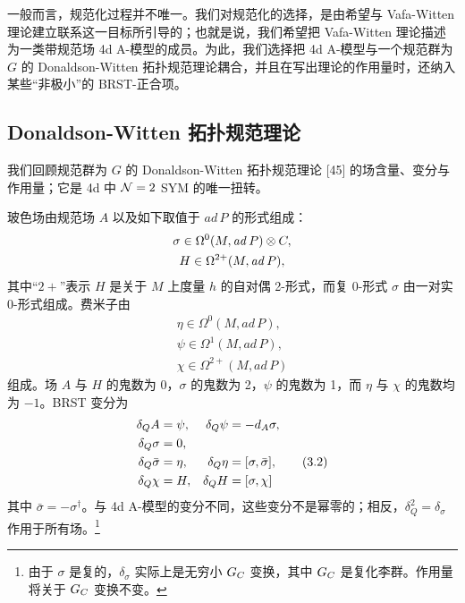 一般而言，规范化过程并不唯一。我们对规范化的选择，是由希望与 Vafa-Witten 理论建立联系这一目标所引导的；也就是说，我们希望把 Vafa-Witten 理论描述为一类带规范场 4d A-模型的成员。为此，我们选择把 4d A-模型与一个规范群为 $G$ 的 Donaldson-Witten 拓扑规范理论耦合，并且在写出理论的作用量时，还纳入某些“非极小”的 BRST-正合项。

\subsection{Donaldson-Witten 拓扑规范理论}

我们回顾规范群为 $G$ 的 Donaldson-Witten 拓扑规范理论 [45] 的场含量、变分与作用量；它是 4d 中 $\mathcal{N}=2$ SYM 的唯一扭转。

玻色场由规范场 $A$ 以及如下取值于 $\mathit{ad}\,P$ 的形式组成：
\begin{gather*}
  \sigma\in\Omega^0(M,\mathit{ad}\,P)\otimes C,\\
  H\in\Omega^{2+}(M,\mathit{ad}\,P),
\end{gather*}
其中“$2+$”表示 $H$ 是关于 $M$ 上度量 $h$ 的自对偶 2-形式，而复 0-形式 $\sigma$ 由一对实 0-形式组成。费米子由
\begin{gather*}
  \eta\in\Omega^0(M,\mathit{ad}\,P),\\
  \psi\in\Omega^1(M,\mathit{ad}\,P),\\
  \chi\in\Omega^{2+}(M,\mathit{ad}\,P)
\end{gather*}
组成。场 $A$ 与 $H$ 的鬼数为 0，$\sigma$ 的鬼数为 2，$\psi$ 的鬼数为 1，而 $\eta$ 与 $\chi$ 的鬼数均为 $-1$。BRST 变分为
\begin{align}
  \delta_QA &= \psi, & \delta_Q\psi &= -d_A\sigma, \notag\\
  \delta_Q\sigma &= 0, \notag\\
  \delta_Q\bar\sigma &= \eta, & \delta_Q\eta &= [\sigma,\bar\sigma], \tag{3.2}\\
  \delta_Q\chi &= H, & \delta_QH &= [\sigma,\chi] \notag
\end{align}
其中 $\bar\sigma=-\sigma^\dagger$。与 4d A-模型的变分不同，这些变分不是幂零的；相反，$\delta_Q^2=\delta_\sigma$ 作用于所有场。\footnote{由于 $\sigma$ 是复的，$\delta_\sigma$ 实际上是无穷小 $G_C$ 变换，其中 $G_C$ 是复化李群。作用量将关于 $G_C$ 变换不变。}


